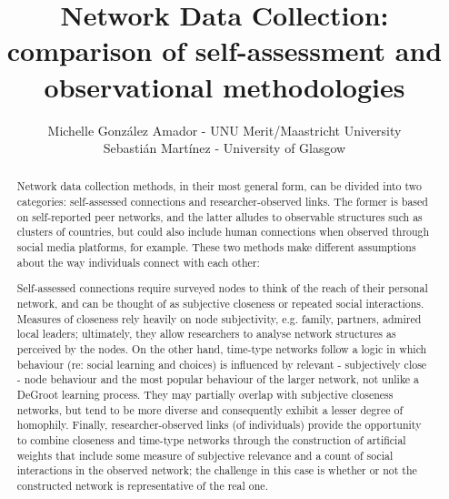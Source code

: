 \documentclass[11pt, oneside]{article}   	%
\title{Network Data Collection: comparison of self-assessment and observational methodologies}
\author{Michelle Gonz\'alez Amador - UNU Merit/Maastricht University\\
Sebasti\'an Mart\'inez - University of Glasgow}
\date{}							%
\theoremstyle{plain}
\theoremstyle{definition}
\begin{document}
\vskip -2cm
\begin{center}
{\let\newpage\relax\maketitle}
\end{center}
\begin{abstract}
Network data collection methods, in their most general form, can be divided into two categories: self-assessed connections and researcher-observed links. The former is based on self-reported peer networks, and the latter alludes to observable structures such as clusters of countries, but could also include human connections when observed through social media platforms, for example. These two methods make different assumptions about the way individuals connect with each other:

Self-assessed connections require surveyed nodes to think of the reach of their personal network, and can be thought of as subjective closeness or repeated social interactions. Measures of closeness rely heavily on node subjectivity, e.g. family, partners, admired local leaders; ultimately, they allow researchers to analyse network structures as perceived by the nodes. On the other hand, time-type networks follow a logic in which behaviour (re: social learning and choices) is influenced by relevant - subjectively close - node behaviour and the most popular behaviour of the larger network, not unlike a DeGroot learning process. They may partially overlap with subjective closeness networks, but tend to be more diverse and consequently exhibit a lesser degree of homophily. Finally, researcher-observed links (of individuals) provide the opportunity to combine closeness and time-type networks through the construction of artificial weights that include some measure of subjective relevance and a count of social interactions in the observed network; the challenge in this case is whether or not the constructed network is representative of the real one. 


\end{abstract}
\end{document}
